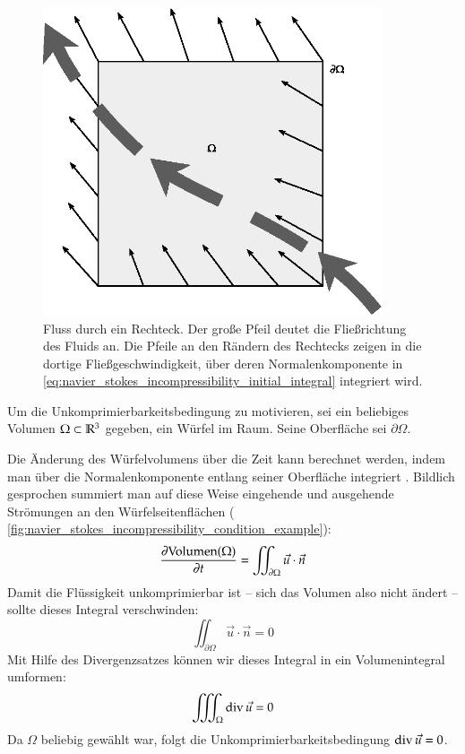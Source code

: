 \begin{figure}[ht]
\centering
\includegraphics[width=10cm]{images/incompressibility_condition_example}
\caption{Fluss durch ein Rechteck. Der große Pfeil deutet die Fließrichtung des Fluids an. Die Pfeile an den Rändern des Rechtecks zeigen in die dortige Fließgeschwindigkeit, über deren Normalenkomponente in \autoref{eq:navier_stokes_incompressibility_initial_integral} integriert wird.}
\label{fig:navier_stokes_incompressibility_condition_example}
\end{figure}

Um die Unkomprimierbarkeitsbedingung zu motivieren, sei ein beliebiges Volumen
$\Omega \subset \mathbb{R}^3$ gegeben, \PimiddyzB ein Würfel im Raum. Seine
Oberfläche sei $\partial \Omega$.

Die Änderung des Würfelvolumens über die Zeit kann berechnet werden,
indem man über die Normalenkomponente entlang seiner Oberfläche
integriert \cite{Chorin1980}. Bildlich gesprochen summiert man auf
diese Weise eingehende und ausgehende Strömungen an den
Würfelseitenflächen (\Pimiddyvgl
\autoref{fig:navier_stokes_incompressibility_condition_example}):
\begin{equation}
\label{eq:navier_stokes_incompressibility_initial_integral}
\frac{
	\partial \textnormal{Volumen}(\Omega)
}
{
	\partial t
}
=
\iint_{\partial \Omega} \vec{u} \cdot \vec{n}
\end{equation}
Damit die Flüssigkeit unkomprimierbar ist -- sich das Volumen also
nicht ändert -- sollte dieses Integral verschwinden:
\begin{equation}
\iint_{\partial \Omega} \vec{u} \cdot \vec{n} = 0
\end{equation}
Mit Hilfe des Divergenzsatzes können wir dieses Integral in ein Volumenintegral
umformen:
\begin{equation}
\iiint_\Omega \operatorname*{div} \vec{u} = 0
\end{equation}
Da $\Omega$ beliebig gewählt war, folgt die
Unkomprimierbarkeitsbedingung $\operatorname*{div} \vec{u} = 0$.

